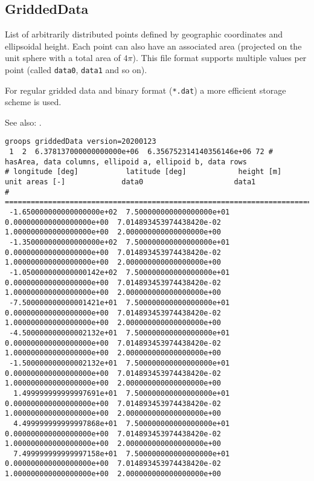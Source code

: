 \subsection{GriddedData}\label{general.fileFormat:griddedData}
List of arbitrarily distributed points defined by geographic coordinates and ellipsoidal
height. Each point can also have an associated area
(projected on the unit sphere with a total area of $4\pi$).
This file format supports multiple values per point (called \verb|data0|, \verb|data1| and so on).

For regular gridded data and binary format (\verb|*.dat|) a more efficient storage scheme is used.

See also: .

\begin{verbatim}
groops griddedData version=20200123
 1  2  6.378137000000000000e+06  6.356752314140356146e+06 72 # hasArea, data columns, ellipoid a, ellipoid b, data rows
# longitude [deg]           latitude [deg]            height [m]                unit areas [-]             data0                     data1
# ===========================================================================================================================================================
 -1.650000000000000000e+02  7.500000000000000000e+01  0.000000000000000000e+00  7.014893453974438420e-02  1.000000000000000000e+00  2.000000000000000000e+00
 -1.350000000000000000e+02  7.500000000000000000e+01  0.000000000000000000e+00  7.014893453974438420e-02  1.000000000000000000e+00  2.000000000000000000e+00
 -1.050000000000000142e+02  7.500000000000000000e+01  0.000000000000000000e+00  7.014893453974438420e-02  1.000000000000000000e+00  2.000000000000000000e+00
 -7.500000000000001421e+01  7.500000000000000000e+01  0.000000000000000000e+00  7.014893453974438420e-02  1.000000000000000000e+00  2.000000000000000000e+00
 -4.500000000000002132e+01  7.500000000000000000e+01  0.000000000000000000e+00  7.014893453974438420e-02  1.000000000000000000e+00  2.000000000000000000e+00
 -1.500000000000002132e+01  7.500000000000000000e+01  0.000000000000000000e+00  7.014893453974438420e-02  1.000000000000000000e+00  2.000000000000000000e+00
  1.499999999999997691e+01  7.500000000000000000e+01  0.000000000000000000e+00  7.014893453974438420e-02  1.000000000000000000e+00  2.000000000000000000e+00
  4.499999999999997868e+01  7.500000000000000000e+01  0.000000000000000000e+00  7.014893453974438420e-02  1.000000000000000000e+00  2.000000000000000000e+00
  7.499999999999997158e+01  7.500000000000000000e+01  0.000000000000000000e+00  7.014893453974438420e-02  1.000000000000000000e+00  2.000000000000000000e+00

\end{verbatim}
